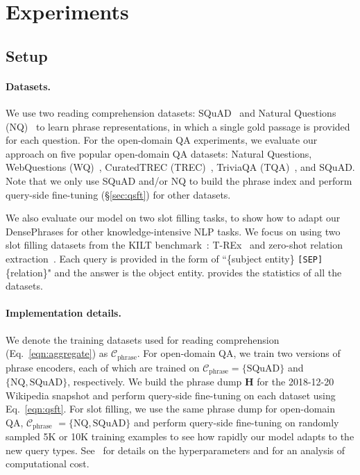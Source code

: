 \documentclass[11pt,a4paper]{article}
\newcommand{\ours}{DensePhrases}
\newcommand{\phrasedump}{\mf{H}}
\newcommand{\traincorpus}{\mathcal{C}}
\newcommand\ttt[1]{\texttt{#1}}
\newcommand\mf[1]{\mathbf{#1}}
\begin{document}
 



\section{Experiments}
\label{sec:experiments}

\subsection{Setup}
\paragraph{Datasets.}
We use two {reading comprehension} datasets: SQuAD~\cite{rajpurkar2016squad} and Natural Questions (NQ)~\cite{kwiatkowski2019natural} to learn phrase representations, in which a single gold passage is provided for each question.
For the open-domain QA experiments, we evaluate our approach on five popular {open-domain QA} datasets: Natural Questions, WebQuestions (WQ)~\citep{berant2013semantic}, CuratedTREC (TREC)~\citep{baudivs2015modeling}, TriviaQA (TQA)~\citep{joshi2017triviaqa}, and SQuAD.
Note that we only use SQuAD and/or NQ to build the phrase index and perform query-side fine-tuning (\S\ref{sec:qsft}) for other datasets.


We also evaluate our model on two {slot filling} tasks, to show how to adapt our {\ours} for other knowledge-intensive NLP tasks.
We focus on using two slot filling datasets from the KILT benchmark~\citep{petroni2020kilt}: T-REx~\citep{elsahar2018t} and zero-shot relation extraction~\citep{levy2017zero}.
Each query is provided in the form of ``\{subject entity\} \ttt{[SEP]} \{relation\}" and the answer is the object entity.
 provides the statistics of all the datasets.

\paragraph{Implementation details.}
We denote the training datasets used for reading comprehension (Eq.~\eqref{eqn:aggregate}) as $\traincorpus_\text{phrase}$.
For open-domain QA, we train two versions of phrase encoders, each of which are trained on $\traincorpus_\text{phrase}=\{\text{SQuAD}\}$ and $\{\text{NQ}, \text{SQuAD}\}$, respectively.
We build the phrase dump $\phrasedump$ for the 2018-12-20 Wikipedia snapshot and perform query-side fine-tuning on each dataset using Eq.~\eqref{eqn:qsft}.
For slot filling, we use the same phrase dump for open-domain QA, $\traincorpus_\text{phrase}$ $=\{\text{NQ}, \text{SQuAD}\}$  and perform query-side fine-tuning on randomly sampled 5K or 10K training examples to see how rapidly our model adapts to the new query types.
See~ for details on the hyperparameters and  for an analysis of computational cost.
\end{document}
